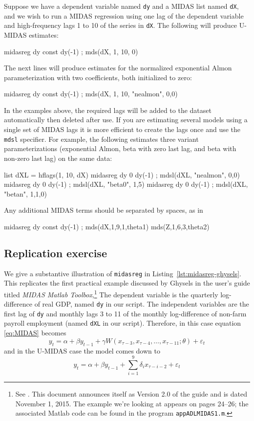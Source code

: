 Suppose we have a dependent variable named \texttt{dy} and a MIDAS
list named \texttt{dX}, and we wish to run a MIDAS regression using
one lag of the dependent variable and high-frequency lags 1 to 10 of
the series in \texttt{dX}. The following will produce U-MIDAS
estimates:
%
\begin{code}
midasreg dy const dy(-1) ; mds(dX, 1, 10, 0)
\end{code}
%
The next lines will produce estimates for the normalized exponential
Almon parameterization with two coefficients, both initialized to
zero:
%
\begin{code}
midasreg dy const dy(-1) ; mds(dX, 1, 10, "nealmon", {0,0})
\end{code}
%
In the examples above, the required lags will be added to the dataset
automatically then deleted after use. If you are estimating several
models using a single set of MIDAS lags it is more efficient to create
the lags once and use the \texttt{mdsl} specifier.  For example, the
following estimates three variant parameterizations (exponential
Almon, beta with zero last lag, and beta with non-zero last lag) on
the same data:
\begin{code}
list dXL = hflags(1, 10, dX)
midasreg dy 0 dy(-1) ; mdsl(dXL, "nealmon", {0,0})
midasreg dy 0 dy(-1) ; mdsl(dXL, "beta0", {1,5})
midasreg dy 0 dy(-1) ; mdsl(dXL, "betan", {1,1,0})
\end{code}

Any additional MIDAS terms should be separated by spaces, as in
\begin{code}
midasreg dy const dy(-1) ; mds(dX,1,9,1,theta1) mds(Z,1,6,3,theta2)
\end{code}

\subsection{Replication exercise}

We give a substantive illustration of \texttt{midasreg} in
Listing~\ref{lst:midasreg-ghysels}. This replicates the first
practical example discussed by Ghysels in the user's guide titled
\textit{MIDAS Matlab Toolbox},\footnote{See \cite{ghysels15}. This
  document announces itself as Version 2.0 of the guide and is dated
  November 1, 2015. The example we're looking at appears on pages
  24--26; the associated \textsf{Matlab} code can be found in the
  program \texttt{appADLMIDAS1.m}.}
The dependent variable is the quarterly log-difference of
real GDP, named \texttt{dy} in our script. The independent variables
are the first lag of \texttt{dy} and monthly lags 3 to 11 of the
monthly log-difference of non-farm payroll employment (named
\texttt{dXL} in our script). Therefore, in this case equation
\eqref{eq:MIDAS} becomes
\[
  y_t = \alpha + \beta y_{t-1} + \gamma W(x_{\tau-3}, x_{\tau-4},\dots,
  x_{\tau-11}; \theta) + \varepsilon_t
\]
and in the U-MIDAS case the model comes down to
\[
  y_t = \alpha + \beta y_{t-1} + \sum_{i=1}^9 \delta_i x_{\tau-i-2}
  + \varepsilon_t
\]

